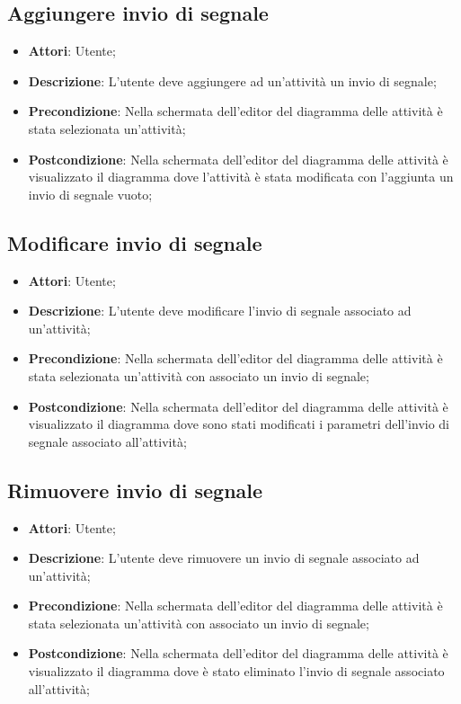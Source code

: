 \documentclass[../AnalisiDeiRequisiti.tex]{subfiles}
\begin{document}
	\subsection{Aggiungere invio di segnale}
	\begin{itemize}
		\item \textbf{Attori}: Utente;
		\item \textbf{Descrizione}: L'utente deve aggiungere ad un'attività un invio di segnale;
		\item \textbf{Precondizione}: Nella schermata dell'editor del diagramma delle attività è stata selezionata un'attività;
		\item \textbf{Postcondizione}: Nella schermata dell'editor del diagramma delle attività è visualizzato il diagramma dove l'attività è stata modificata con l'aggiunta un invio di segnale vuoto;
	\end{itemize}
	
	\subsection{Modificare invio di segnale}
	\begin{itemize}
		\item \textbf{Attori}: Utente;
		\item \textbf{Descrizione}: L'utente deve modificare l'invio di segnale associato ad un'attività;
		\item \textbf{Precondizione}: Nella schermata dell'editor del diagramma delle attività è stata selezionata un'attività con associato un invio di segnale;
		\item \textbf{Postcondizione}: Nella schermata dell'editor del diagramma delle attività è visualizzato il diagramma dove sono stati modificati i parametri dell'invio di segnale associato all'attività;
	\end{itemize}
	
	\subsection{Rimuovere invio di segnale}
	\begin{itemize}
		\item \textbf{Attori}: Utente;
		\item \textbf{Descrizione}: L'utente deve rimuovere un invio di segnale associato ad un'attività;
		\item \textbf{Precondizione}: Nella schermata dell'editor del diagramma delle attività è stata selezionata un'attività con associato un invio di segnale;
		\item \textbf{Postcondizione}: Nella schermata dell'editor del diagramma delle attività è visualizzato il diagramma dove è stato eliminato l'invio di segnale associato all'attività;
	\end{itemize}
		
\end{document}
